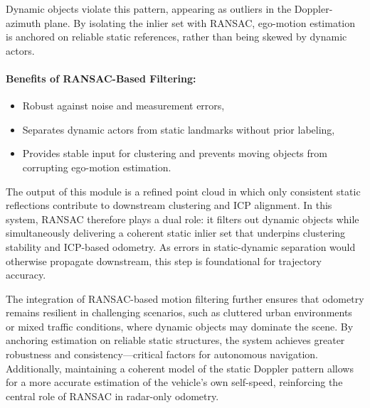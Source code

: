 Dynamic objects violate this pattern, appearing as outliers in the Doppler-azimuth plane. 
By isolating the inlier set with RANSAC, ego-motion estimation is anchored on reliable static references, rather than being skewed by dynamic actors.

\paragraph{Benefits of RANSAC-Based Filtering:}
\begin{itemize}
    \item Robust against noise and measurement errors,
    \item Separates dynamic actors from static landmarks without prior labeling,
    \item Provides stable input for clustering and prevents moving objects from corrupting ego-motion estimation.
\end{itemize}

The output of this module is a refined point cloud in which only consistent static reflections contribute to downstream clustering and ICP alignment. 
In this system, RANSAC therefore plays a dual role: it filters out dynamic objects while simultaneously delivering a coherent static inlier set that underpins clustering stability and ICP-based odometry. 
As errors in static-dynamic separation would otherwise propagate downstream, this step is foundational for trajectory accuracy.

The integration of RANSAC-based motion filtering further ensures that odometry remains resilient in challenging scenarios, such as cluttered urban environments or mixed traffic conditions, where dynamic objects may dominate the scene. 
By anchoring estimation on reliable static structures, the system achieves greater robustness and consistency—critical factors for autonomous navigation. 
Additionally, maintaining a coherent model of the static Doppler pattern allows for a more accurate estimation of the vehicle's own self-speed, reinforcing the central role of RANSAC in radar-only odometry.
